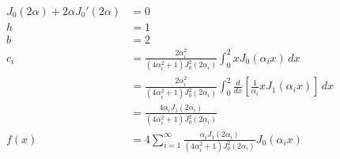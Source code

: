 \documentclass{article}
\begin{document}
\begin{align*}
  J_0(2 \alpha) + 2 \alpha J_0'(2 \alpha) & = 0                                                                                                                                           \\
  h                                       & = 1                                                                                                                                           \\
  b                                       & = 2                                                                                                                                           \\
  c_i                                     & = \frac{2 \alpha_i^2}{(4 \alpha_i^2 + 1) J_0^2 (2 \alpha_i)} \int_0^2 x J_0(\alpha_i x) \,d x                                                 \\
                                          & = \frac{2 \alpha_i^2}{(4 \alpha_i^2 + 1) J_0^2 (2 \alpha_i)} \int_0^2 \frac{d}{d x} \left[ \frac{1}{\alpha_i} x J_1(\alpha_i x) \right] \,d x \\
                                          & = \frac{4 \alpha_i J_1(2 \alpha_i)}{(4 \alpha_i^2 + 1) J_0^2 (2 \alpha_i)}                                                                    \\
  f(x)                                    & = 4 \sum_{i = 1}^\infty \frac{\alpha_i J_1(2 \alpha_i)}{(4 \alpha_i^2 + 1) J_0^2 (2 \alpha_i)} J_0(\alpha_i x)
\end{align*}

\setcounter{subsubsection}{6}
\subsubsection{}
\end{document}
